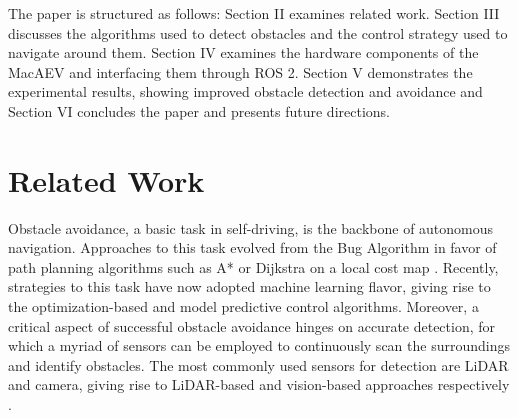 \documentclass[conference]{IEEEtran}
\begin{document}


The paper is structured as follows: Section II examines related work. Section III discusses the 
algorithms used to detect obstacles and the control strategy used to navigate around them. Section IV examines the hardware components of the MacAEV and interfacing them through ROS 2. Section V demonstrates the experimental results, showing improved obstacle detection and avoidance and Section VI concludes the paper and presents future directions. 


\section{Related Work}
Obstacle avoidance, a basic task in self-driving, is the backbone of autonomous navigation. Approaches to this task evolved from the Bug Algorithm in favor of path planning algorithms such as A* or Dijkstra on a local cost map \cite{b1}. Recently, strategies to this task have now adopted machine learning flavor, giving rise to the optimization-based and model predictive control algorithms.    
Moreover, a critical aspect of successful obstacle avoidance hinges on accurate detection, for which a myriad of sensors can be employed to continuously scan the surroundings and identify obstacles. The most commonly used sensors for detection are LiDAR and camera, giving rise to LiDAR-based and vision-based approaches respectively \cite{b2}. 
\end{document}
